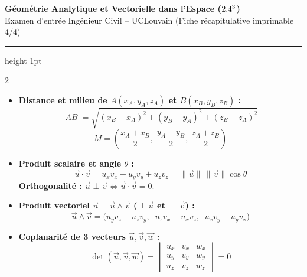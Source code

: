 \begin{center}
    {\LARGE\bfseries\color{uclblue} Géométrie Analytique et Vectorielle dans l'Espace ($2.4^3$)}\\[2pt]
    {\small\color{darkgray} Examen d'entrée Ingénieur Civil -- UCLouvain (Fiche récapitulative imprimable 4/4)}
    \vspace{2pt}
    \hrule height 1pt
\end{center}
\vspace{-6pt}

{\fontsize{9.5pt}{11.5pt}\selectfont
\setlength{\columnsep}{18pt}
\begin{multicols}{2}

\begin{itemize}[leftmargin=1.2em, itemsep=2pt, topsep=2pt]
    \item \textbf{Distance et milieu de $A(x_A,y_A,z_A)$ et $B(x_B,y_B,z_B)$ :}
    \[
        |AB| = \sqrt{(x_B-x_A)^2 + (y_B-y_A)^2 + (z_B-z_A)^2}
    \]
    \[
        M = \left(\frac{x_A+x_B}{2},\; \frac{y_A+y_B}{2},\; \frac{z_A+z_B}{2}\right)
    \]
    \item \textbf{Produit scalaire et angle $\theta$ :}
    \[
        \vec{u}\cdot\vec{v} = u_x v_x + u_y v_y + u_z v_z = \|\vec{u}\|\,\|\vec{v}\|\cos\theta
    \]
    \textbf{Orthogonalité :} $\vec{u} \perp \vec{v} \iff \vec{u}\cdot\vec{v} = 0$.
    \item \textbf{Produit vectoriel $\vec{n} = \vec{u} \wedge \vec{v}$ ($\perp \vec{u}$ et $\perp \vec{v}$) :}
    \[
        \vec{u}\wedge\vec{v} = \bigl(u_y v_z - u_z v_y,\;\; u_z v_x - u_x v_z,\;\; u_x v_y - u_y v_x\bigr)
    \]
    \item \textbf{Coplanarité de 3 vecteurs $\vec{u}, \vec{v}, \vec{w}$ :}
    \[
        \det(\vec{u},\vec{v},\vec{w}) = \begin{vmatrix} u_x & v_x & w_x \\ u_y & v_y & w_y \\ u_z & v_z & w_z \end{vmatrix} = 0
    \]
\end{itemize}


\end{multicols}}
